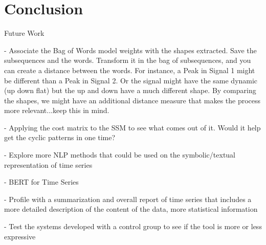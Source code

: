 
%

\chapter{Conclusion}
\label{cha:Conclusion}



Future Work

- Associate the Bag of Words model weights with the shapes extracted. Save the subsequences and the words. Transform it in the bag of subsequences, and you can create a distance between the words. For instance, a Peak in Signal 1 might be different than a Peak in Signal 2. Or the signal might have the same dynamic (up down flat) but the up and down have a much different shape. By comparing the shapes, we might have an additional distance measure that makes the process more relevant...keep this in mind.

- Applying the cost matrix to the SSM to see what comes out of it. Would it help get the cyclic patterns in one time?

- Explore more NLP methods that could be used on the symbolic/textual representation of time series

- BERT for Time Series

- Profile with a summarization and overall report of time series that includes a more detailed description of the content of the data, more statistical information

- Test the systems developed with a control group to see if the tool is more or less expressive


